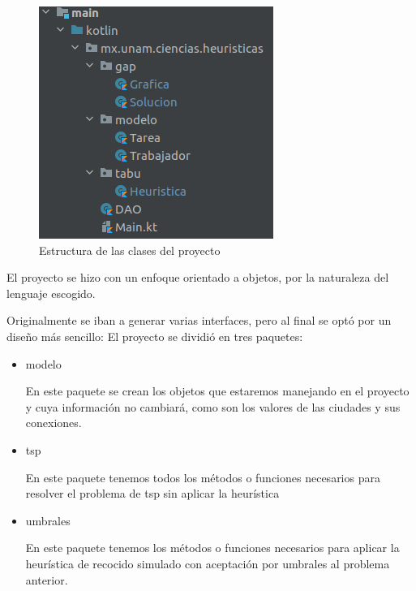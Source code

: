 \documentclass{article}
\begin{document}
\begin{figure}[H]
	\centering
	\includegraphics[scale=0.8]{imgs/estructura.png}
	\caption{Estructura de las clases del proyecto}
\end{figure}

El proyecto se hizo con un enfoque orientado a objetos, por la naturaleza del lenguaje escogido. 

Originalmente se iban a generar varias interfaces, pero al final se optó por un diseño más sencillo: El proyecto se dividió en tres paquetes: 
\begin{itemize}
	\item modelo
	
	En este paquete se crean los objetos que estaremos manejando en el proyecto y cuya información no cambiará, como son los valores de las ciudades y sus conexiones.
	\item tsp
	
	En este paquete tenemos todos los métodos o funciones necesarios para resolver el problema de tsp sin aplicar la heurística
	\item umbrales
	
	En este paquete tenemos los métodos o funciones necesarios para aplicar la heurística de recocido simulado con aceptación por umbrales al problema anterior.
\end{itemize}
\end{document}
